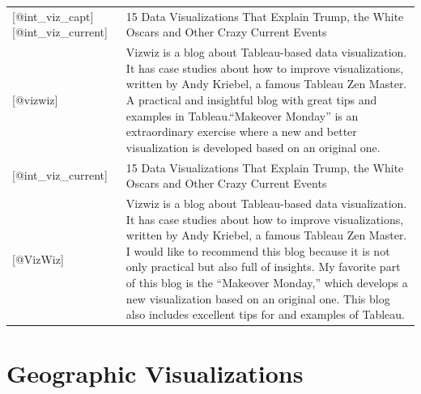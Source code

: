 \documentclass[]{book}
\theoremstyle{definition}
\theoremstyle{definition}
\theoremstyle{definition}
\theoremstyle{remark}
\begin{document}
\begin{longtable}[]{@{}ll@{}}
\begin{minipage}[t]{0.15\columnwidth}\raggedright\strut
{[}@int\_viz\_capt{]}{[}@int\_viz\_current{]}\strut
\end{minipage} & \begin{minipage}[t]{0.79\columnwidth}\raggedright\strut
15 Data Visualizations That Explain Trump, the White Oscars and Other
Crazy Current Events\strut
\end{minipage}\tabularnewline
\begin{minipage}[t]{0.15\columnwidth}\raggedright\strut
{[}@vizwiz{]}\strut
\end{minipage} & \begin{minipage}[t]{0.79\columnwidth}\raggedright\strut
Vizwiz is a blog about Tableau-based data visualization. It has case
studies about how to improve visualizations, written by Andy Kriebel, a
famous Tableau Zen Master. A practical and insightful blog with great
tips and examples in Tableau.``Makeover Monday'' is an extraordinary
exercise where a new and better visualization is developed based on an
original one.\strut
\end{minipage}\tabularnewline
\begin{minipage}[t]{0.15\columnwidth}\raggedright\strut
{[}@int\_viz\_current{]}\strut
\end{minipage} & \begin{minipage}[t]{0.79\columnwidth}\raggedright\strut
15 Data Visualizations That Explain Trump, the White Oscars and Other
Crazy Current Events\strut
\end{minipage}\tabularnewline
\begin{minipage}[t]{0.15\columnwidth}\raggedright\strut
{[}@VizWiz{]}\strut
\end{minipage} & \begin{minipage}[t]{0.79\columnwidth}\raggedright\strut
Vizwiz is a blog about Tableau-based data visualization. It has case
studies about how to improve visualizations, written by Andy Kriebel, a
famous Tableau Zen Master. I would like to recommend this blog because
it is not only practical but also full of insights. My favorite part of
this blog is the ``Makeover Monday,'' which develops a new visualization
based on an original one. This blog also includes excellent tips for and
examples of Tableau.\strut
\end{minipage}\tabularnewline
\bottomrule
\end{longtable}

\section{Geographic Visualizations}\label{geographic-visualizations}
\end{document}
